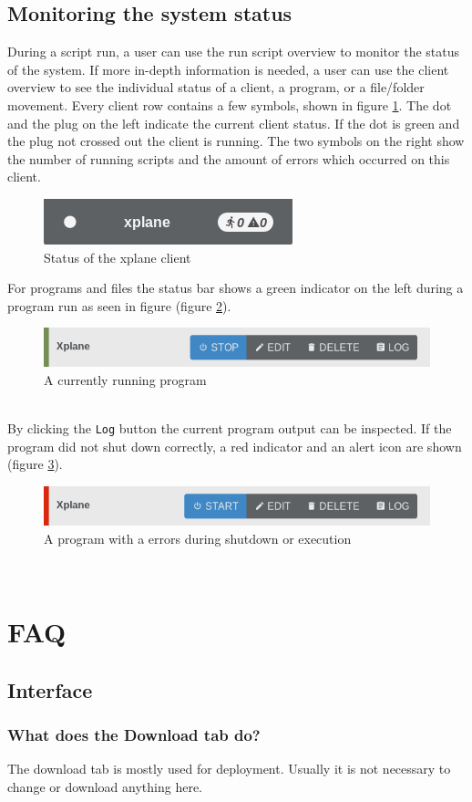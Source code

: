 \documentclass[accentcolor=tud1a, paper=a4, colorback]{tudreport}
\begin{document}
	\section{Monitoring the system status}
	During a script run, a user can use the run script overview to monitor the status of the
	system. If more in-depth information is needed, a user can use the client overview to
	see the individual status of a client, a program, or a file/folder movement.
	Every client row contains a few symbols, shown in figure \ref{client_status}.
	The dot and the plug on the left indicate the current client status. If the dot is
	green and the plug not crossed out the client is running. The two symbols on the right
	show the number of running scripts and the amount of errors which occurred on this client.
	\begin{figure}[h]
		\centering
		\includegraphics[width=.3\textwidth]{client_status}
		\caption{Status of the xplane client}
		\label{client_status}
	\end{figure}
	For programs and files the status bar shows a green indicator on the left during a program run as seen in figure (figure \ref{running_program}).
	\begin{figure}[h]
		\centering
		\includegraphics[width=.6\textwidth]{running_program}
		\caption{A currently running program}
		\label{running_program}
	\end{figure}\\
	By clicking the \texttt{Log} button the current program output can be inspected.
	If the program did not shut down correctly, a red indicator and an alert icon are shown (figure \ref{failed_program}).
	\begin{figure}[h]
		\centering
		\includegraphics[width=.6\textwidth]{failed_program}
		\caption{A program with a errors during shutdown or execution}
		\label{failed_program}
	\end{figure}\\


	\chapter{FAQ}
	\section{Interface}
	\subsection{What does the Download tab do?}
	The download tab is mostly used for deployment. Usually it is not necessary to change or
	download anything here.

	\clearpage
	\printindex
\end{document}
